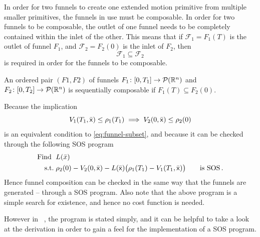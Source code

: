 In order for two funnels to create one extended motion primitive from multiple
smaller primitives, the funnels in use must be composable. In order for two
funnels to be composable, the outlet of one funnel needs to be completely
contained within the inlet of the other. This means that if \(\mathcal{F}_1 =
F_1(T)\) is the outlet of funnel \(F_1\), and \(\mathcal{F}_2 = F_2(0)\) is the
inlet of \(F_2\), then
\begin{equation}
  \label{eq:funnel-subset}
  \mathcal{F}_1 \subseteq \mathcal{F}_2
\end{equation}
is required in order for the funnels to be composable.
\begin{definition}
  \label{def:funnel-composition}
  An ordered pair \((F1, F2)\) of funnels \(F_1 \colon [0,T_1] \rightarrow
  \mathcal{P}(\mathbb{R}^n)\) and \(F_2 \colon [0,T_2] \rightarrow \mathcal{P}(\mathbb{R}^n)\)
  is sequentially composable if \(F_1(T) \subseteq F_2(0)\).
\end{definition}
Because the implication
\begin{equation}
  V_1(T_1,\bar{{\mathbf{\mathsf{x}}}}) \leq \rho_1(T_1) \implies V_2(0,\bar{{\mathbf{\mathsf{x}}}}) \leq
  \rho_2(0)
\end{equation}
is an equivalent condition to \cref{eq:funnel-subset}, and because it can be
checked through the following \ac{SOS} program
\begin{align}
  \text{Find } \; &L(\bar{x})  \\
  \text{s.t.} \; &\rho_2(0) - V_2( 0,\bar{{\mathbf{\mathsf{x}}}}) - L(\bar{{\mathbf{\mathsf{x}}}})
                  \bigl( \rho_1(T_1) - V_1(T_1,\bar{{\mathbf{\mathsf{x}}}}) \bigr) \qquad \text{is SOS} \, . \nonumber
\end{align}
Hence funnel composition can be checked in the same way that the funnels are
generated -- through a \ac{SOS} program. Also note that the above program is a
simple search for existence, and hence no cost function is needed.

However in
\citeauthor{majumdarFunnelLibrariesRealtime2017}~\cite{majumdarFunnelLibrariesRealtime2017},
the program is stated simply, and it can be helpful to take a look at the
derivation in order to gain a feel for the implementation of a \ac{SOS} program.

